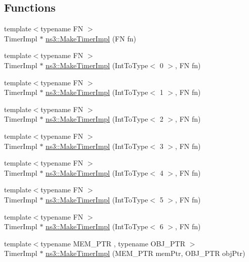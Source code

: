 \subsection*{Functions}
\begin{DoxyCompactItemize}
\item 
{\footnotesize template$<$typename FN $>$ }\\Timer\+Impl $\ast$ \hyperlink{group__timerimpl_ga748e39fd757c246f91d3488175ec12b5}{ns3\+::\+Make\+Timer\+Impl} (FN fn)
\item 
{\footnotesize template$<$typename FN $>$ }\\Timer\+Impl $\ast$ \hyperlink{group__timerimpl_ga8c9e10587a1cf9c20ba6f9228388f82d}{ns3\+::\+Make\+Timer\+Impl} (Int\+To\+Type$<$ 0 $>$, FN fn)
\item 
{\footnotesize template$<$typename FN $>$ }\\Timer\+Impl $\ast$ \hyperlink{group__timerimpl_gadca3190feb924f10c66dbecf863562d8}{ns3\+::\+Make\+Timer\+Impl} (Int\+To\+Type$<$ 1 $>$, FN fn)
\item 
{\footnotesize template$<$typename FN $>$ }\\Timer\+Impl $\ast$ \hyperlink{group__timerimpl_gaab7cf883d78bd50e35af89981d4f96ec}{ns3\+::\+Make\+Timer\+Impl} (Int\+To\+Type$<$ 2 $>$, FN fn)
\item 
{\footnotesize template$<$typename FN $>$ }\\Timer\+Impl $\ast$ \hyperlink{group__timerimpl_ga52c2853cfa4c84e7ffd71adae2006f00}{ns3\+::\+Make\+Timer\+Impl} (Int\+To\+Type$<$ 3 $>$, FN fn)
\item 
{\footnotesize template$<$typename FN $>$ }\\Timer\+Impl $\ast$ \hyperlink{group__timerimpl_gad47119c32451ba8bea7ee25e7cb248c4}{ns3\+::\+Make\+Timer\+Impl} (Int\+To\+Type$<$ 4 $>$, FN fn)
\item 
{\footnotesize template$<$typename FN $>$ }\\Timer\+Impl $\ast$ \hyperlink{group__timerimpl_ga396dbfed131d4ef1fb72dcae1aee23ce}{ns3\+::\+Make\+Timer\+Impl} (Int\+To\+Type$<$ 5 $>$, FN fn)
\item 
{\footnotesize template$<$typename FN $>$ }\\Timer\+Impl $\ast$ \hyperlink{group__timerimpl_gac25787f4a97a1dfb51f897f69235dde5}{ns3\+::\+Make\+Timer\+Impl} (Int\+To\+Type$<$ 6 $>$, FN fn)
\item 
{\footnotesize template$<$typename M\+E\+M\+\_\+\+P\+TR , typename O\+B\+J\+\_\+\+P\+TR $>$ }\\Timer\+Impl $\ast$ \hyperlink{group__timerimpl_ga7db1a7f1db781a2a1abcd35036c7089b}{ns3\+::\+Make\+Timer\+Impl} (M\+E\+M\+\_\+\+P\+TR mem\+Ptr, O\+B\+J\+\_\+\+P\+TR obj\+Ptr)

\end{DoxyCompactItemize}
